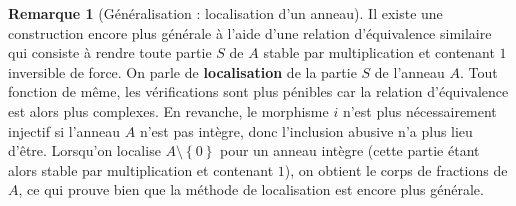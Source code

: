 \documentclass[french]{book}
\theoremstyle{plain}
\theoremstyle{definition}
\newtheorem{rmq}{Remarque}[chapter]
\theoremstyle{remark}
\begin{document}
\begin{rmq}[Généralisation : localisation d'un anneau]
	Il existe une construction encore plus générale à l'aide d'une relation d'équivalence similaire qui consiste à rendre toute partie $S$ de $A$ stable par multiplication et contenant $1$ inversible de force. On parle de \textbf{localisation} de la partie $S$ de l'anneau $A$. Tout fonction de même, les vérifications sont plus pénibles car la relation d'équivalence est alors plus complexes. En revanche, le morphisme $i$ n'est plus nécessairement injectif si l'anneau $A$ n'est pas intègre, donc l'inclusion abusive n'a plus lieu d'être. Lorsqu'on localise $A\setminus\left\{0\right\}$ pour un anneau intègre (cette partie étant alors stable par multiplication et contenant $1$), on obtient le corps de fractions de $A$, ce qui prouve bien que la méthode de localisation est encore plus générale.
\end{rmq}
\end{document}
